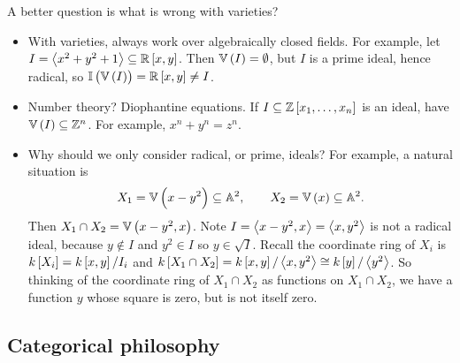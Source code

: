 A better question is what is wrong with varieties?
\begin{itemize}
\item With varieties, always work over algebraically closed fields. For example, let $ I = \abr{x^2 + y^2 + 1} \subseteq \RR\sbr{x, y} $. Then $ \VV\br{I} = \emptyset $, but $ I $ is a prime ideal, hence radical, so $ \II\br{\VV\br{I}} = \RR\sbr{x, y} \ne I $.
\item Number theory? Diophantine equations. If $ I \subseteq \ZZ\sbr{x_1, \dots, x_n} $ is an ideal, have $ \VV\br{I} \subseteq \ZZ^n $. For example, $ x^n + y^n = z^n $.
\item Why should we only consider radical, or prime, ideals? For example, a natural situation is
$$ X_1 = \VV\br{x - y^2} \subseteq \AA^2, \qquad X_2 = \VV\br{x} \subseteq \AA^2. $$
Then $ X_1 \cap X_2 = \VV\br{x - y^2, x} $. Note $ I = \left\langle x - y^2, x \right\rangle = \left\langle x, y^2 \right\rangle $ is not a radical ideal, because $ y \notin I $ and $ y^2 \in I $ so $ y \in \sqrt{I} $. Recall the coordinate ring of $ X_i $ is $ k\sbr{X_i} = k\sbr{x, y} / I_i $ and $ k\sbr{X_1 \cap X_2} = k\sbr{x, y} / \abr{x, y^2} \cong k\sbr{y} / \abr{y^2} $. So thinking of the coordinate ring of $ X_1 \cap X_2 $ as functions on $ X_1 \cap X_2 $, we have a function $ y $ whose square is zero, but is not itself zero.
\end{itemize}

\pagebreak

\subsection{Categorical philosophy}

